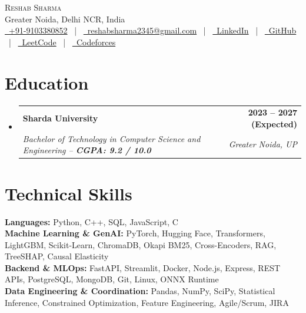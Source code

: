 \documentclass[letterpaper,10pt]{article}
\makeatletter
\newcommand{\resumeSubheading}[4]{
  \vspace{-2pt}\item
    \begin{tabular*}{1.0\textwidth}[t]{l@{\extracolsep{\fill}}r}
      \textbf{\small#1} & \textbf{\footnotesize #2} \\
      \textit{\footnotesize#3} & \textit{\footnotesize #4} \\
    \end{tabular*}\vspace{-6pt}
}
\newcommand{\resumeSubHeadingListStart}{\begin{itemize}[leftmargin=0.0in, label={}]}
\newcommand{\resumeSubHeadingListEnd}{\end{itemize}}
\makeatother
\begin{document}
\begin{center}
    {\LARGE \scshape Reshab Sharma} \\ \vspace{1.5pt}
    Greater Noida, Delhi NCR, India \\ \vspace{2pt}
    \footnotesize 
    \href{tel:+919103380852}{\faPhone\ +91-9103380852} ~|~
    \href{mailto:reshabsharma2345@gmail.com}{\faEnvelope\ reshabsharma2345@gmail.com} ~|~
    \href{https://linkedin.com/in/reshab-sharma-1198a8335/}{\faLinkedin\ LinkedIn} ~|~
    \href{https://github.com/info-extractors}{\faGithub\ GitHub} ~|~
    \href{https://leetcode.com/u/ReshabSharma/}{\faCode\ LeetCode} ~|~
    \href{https://codeforces.com/profile/alwaysAnewbie}{\faTerminal\ Codeforces}
\end{center}
\vspace{-6pt}

\section{Education}
  \resumeSubHeadingListStart
    \resumeSubheading
      {Sharda University}{2023 -- 2027 (Expected)}
      {Bachelor of Technology in Computer Science and Engineering -- \textbf{CGPA: 9.2 / 10.0}}{Greater Noida, UP}
  \resumeSubHeadingListEnd
\vspace{-6pt}

\section{Technical Skills}
 \begin{itemize}[leftmargin=0.0in, label={}]
    \footnotesize{\item{
     \textbf{Languages:} Python, C++, SQL, JavaScript, C \\
     \textbf{Machine Learning \& GenAI:} PyTorch, Hugging Face, Transformers, LightGBM, Scikit-Learn, ChromaDB, Okapi BM25, Cross-Encoders, RAG, TreeSHAP, Causal Elasticity \\
     \textbf{Backend \& MLOps:} FastAPI, Streamlit, Docker, Node.js, Express, REST APIs, PostgreSQL, MongoDB, Git, Linux, ONNX Runtime \\
     \textbf{Data Engineering \& Coordination:} Pandas, NumPy, SciPy, Statistical Inference, Constrained Optimization, Feature Engineering, Agile/Scrum, JIRA
    }}
 \end{itemize}
\vspace{-6pt}
\end{document}
